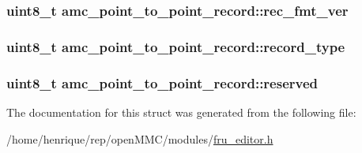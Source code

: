 \hypertarget{structamc__point__to__point__record_a0bc6e0ecfe6c321f9cc6b47f8ada446b}{
\subsubsection[{rec\-\_\-fmt\-\_\-ver}]{\setlength{\rightskip}{0pt plus 5cm}uint8\-\_\-t amc\-\_\-point\-\_\-to\-\_\-point\-\_\-record\-::rec\-\_\-fmt\-\_\-ver}}\label{structamc__point__to__point__record_a0bc6e0ecfe6c321f9cc6b47f8ada446b}
\hypertarget{structamc__point__to__point__record_a3973c1edc3b23ab9ad298d5bde29cbcd}{
\subsubsection[{record\-\_\-type}]{\setlength{\rightskip}{0pt plus 5cm}uint8\-\_\-t amc\-\_\-point\-\_\-to\-\_\-point\-\_\-record\-::record\-\_\-type}}\label{structamc__point__to__point__record_a3973c1edc3b23ab9ad298d5bde29cbcd}
\hypertarget{structamc__point__to__point__record_afab261eec70e662f0122dfaebd2caf9c}{
\subsubsection[{reserved}]{\setlength{\rightskip}{0pt plus 5cm}uint8\-\_\-t amc\-\_\-point\-\_\-to\-\_\-point\-\_\-record\-::reserved}}\label{structamc__point__to__point__record_afab261eec70e662f0122dfaebd2caf9c}


The documentation for this struct was generated from the following file\-:\begin{DoxyCompactItemize}
\item 
/home/henrique/rep/open\-M\-M\-C/modules/\hyperlink{fru__editor_8h}{fru\-\_\-editor.\-h}\end{DoxyCompactItemize}
